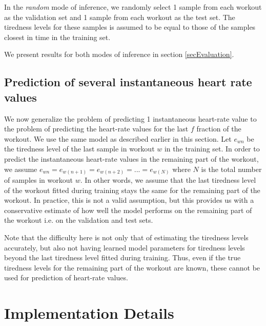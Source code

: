 \documentclass{acm_proc_article-sp}
\begin{document}
In the \emph{random} mode of inference, we randomly select 1 sample from each workout as the validation set and 1 sample from each workout as the test set. The tiredness levels for these samples is assumed to be equal to those of the samples closest in time in the training set. 

We present results for both modes of inference in section \ref{secEvaluation}.

\subsection{Prediction of several instantaneous heart rate values}
We now generalize the problem of predicting 1 instantaneous heart-rate value to the problem of predicting the heart-rate values for the last $f$ fraction of the workout. We use the same model as described earlier in this section. Let $e_{wn}$ be the tiredness level of the last sample in workout $w$ in the training set. In order to predict the instantaneous heart-rate values in the remaining part of the workout, we assume $e_{wn} = e_{w(n+1)} = e_{w(n+2)} = ... = e_{w(N)}$ where $N$ is the total number of samples in workout $w$. In other words, we assume that the last tiredness level of the workout fitted during training stays the same for the remaining part of the workout. In practice, this is not a valid assumption, but this provides us with a conservative estimate of how well the model performs on the remaining part of the workout i.e. on the validation and test sets.

Note that the difficulty here is not only that of estimating the tiredness levels accurately, but also not having learned model parameters for tiredness levels beyond the last tiredness level fitted during training. Thus, even if the true tiredness levels for the remaining part of the workout are known, these cannot be used for prediction of heart-rate values.

\section{Implementation Details}
\label{secImplementationDetails}
\end{document}
